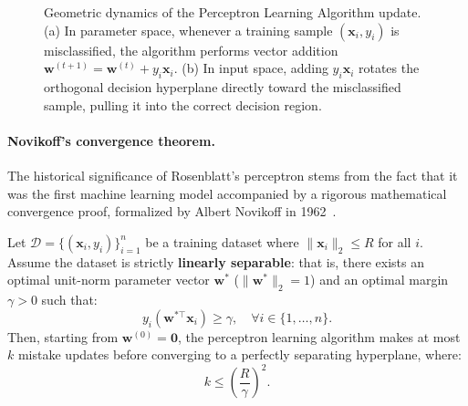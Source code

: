 \begin{figure}[H]
\begin{minipage}{0.48\linewidth}
\end{minipage}
\caption{Geometric dynamics of the Perceptron Learning Algorithm update. (a) In parameter space, whenever a training sample $(\mathbf{x}_i, y_i)$ is misclassified, the algorithm performs vector addition $\mathbf{w}^{(t+1)} = \mathbf{w}^{(t)} + y_i \mathbf{x}_i$. (b) In input space, adding $y_i \mathbf{x}_i$ rotates the orthogonal decision hyperplane directly toward the misclassified sample, pulling it into the correct decision region.}
\label{fig:perceptron_learning_dynamics}
\end{figure}

\paragraph{Novikoff's convergence theorem.}
The historical significance of Rosenblatt's perceptron stems from the fact that it was the first machine learning model accompanied by a rigorous mathematical convergence proof, formalized by Albert Novikoff in 1962~\cite{novikoff1962convergence}.

\begin{theorem}
\label{thm:novikoff_convergence}
Let $\mathcal{D} = \{(\mathbf{x}_i, y_i)\}_{i=1}^n$ be a training dataset where $\|\mathbf{x}_i\|_2 \le R$ for all $i$. Assume the dataset is strictly \textbf{linearly separable}: that is, there exists an optimal unit-norm parameter vector $\mathbf{w}^*$ ($\|\mathbf{w}^*\|_2 = 1$) and an optimal margin $\gamma > 0$ such that:
\begin{equation}
y_i (\mathbf{w}^{*\top} \mathbf{x}_i) \ge \gamma, \quad \forall i \in \{1, \dots, n\}.
\label{eq:linear_separability_condition}
\end{equation}
Then, starting from $\mathbf{w}^{(0)} = \mathbf{0}$, the perceptron learning algorithm makes at most $k$ mistake updates before converging to a perfectly separating hyperplane, where:
\begin{equation}
k \le \left( \frac{R}{\gamma} \right)^2.
\label{eq:novikoff_bound}
\end{equation}
\end{theorem}

